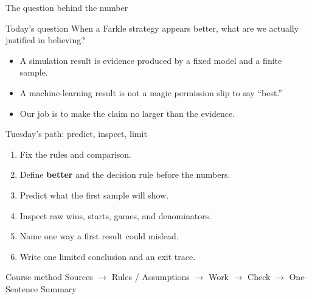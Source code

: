 \begin{frame}
\titlepage
{}
\end{frame}

\begin{frame}{The question behind the number}
\begin{block}{Today's question}
When a Farkle strategy appears better, what are we actually justified in believing?
\end{block}
\begin{itemize}
\item A simulation result is evidence produced by a fixed model and a finite sample.
\item A machine-learning result is not a magic permission slip to say ``best.''
\item Our job is to make the claim no larger than the evidence.
\end{itemize}
\end{frame}

\begin{frame}{Tuesday's path: predict, inspect, limit}
\begin{enumerate}
\item Fix the rules and comparison.
\item Define \textbf{better} and the decision rule before the numbers.
\item Predict what the first sample will show.
\item Inspect raw wins, starts, games, and denominators.
\item Name one way a first result could mislead.
\item Write one limited conclusion and an exit trace.
\end{enumerate}
\vspace{4pt}
\begin{block}{Course method}
Sources \(\rightarrow\) Rules / Assumptions \(\rightarrow\) Work \(\rightarrow\) Check \(\rightarrow\) One-Sentence Summary
\end{block}
\end{frame}

